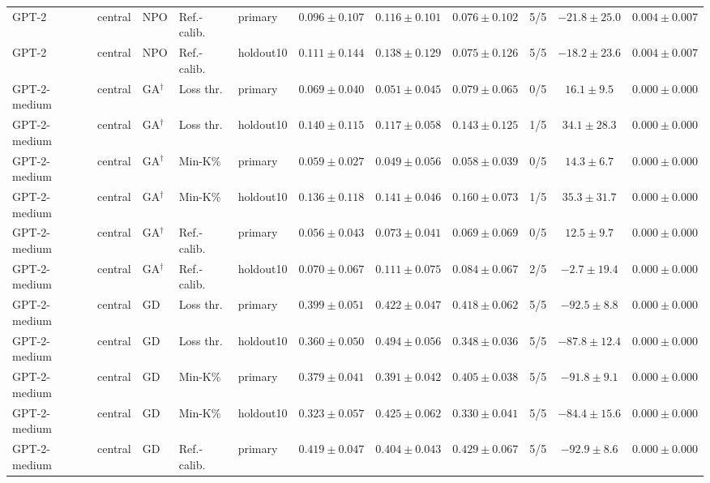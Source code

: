 {\begin{longtable}{@{\extracolsep{\fill}}lllllcccccc@{}}
GPT-2 & central & NPO & Ref.-calib. & primary & $0.096 \pm 0.107$ & $0.116 \pm 0.101$ & $0.076 \pm 0.102$ & 5/5 & $-21.8 \pm 25.0$ & $0.004 \pm 0.007$ \\
GPT-2 & central & NPO & Ref.-calib. & holdout10 & $0.111 \pm 0.144$ & $0.138 \pm 0.129$ & $0.075 \pm 0.126$ & 5/5 & $-18.2 \pm 23.6$ & $0.004 \pm 0.007$ \\
GPT-2-medium & central & GA$^{\dagger}$ & Loss thr. & primary & $0.069 \pm 0.040$ & $0.051 \pm 0.045$ & $0.079 \pm 0.065$ & 0/5 & $16.1 \pm 9.5$ & $0.000 \pm 0.000$ \\
GPT-2-medium & central & GA$^{\dagger}$ & Loss thr. & holdout10 & $0.140 \pm 0.115$ & $0.117 \pm 0.058$ & $0.143 \pm 0.125$ & 1/5 & $34.1 \pm 28.3$ & $0.000 \pm 0.000$ \\
GPT-2-medium & central & GA$^{\dagger}$ & Min-K\% & primary & $0.059 \pm 0.027$ & $0.049 \pm 0.056$ & $0.058 \pm 0.039$ & 0/5 & $14.3 \pm 6.7$ & $0.000 \pm 0.000$ \\
GPT-2-medium & central & GA$^{\dagger}$ & Min-K\% & holdout10 & $0.136 \pm 0.118$ & $0.141 \pm 0.046$ & $0.160 \pm 0.073$ & 1/5 & $35.3 \pm 31.7$ & $0.000 \pm 0.000$ \\
GPT-2-medium & central & GA$^{\dagger}$ & Ref.-calib. & primary & $0.056 \pm 0.043$ & $0.073 \pm 0.041$ & $0.069 \pm 0.069$ & 0/5 & $12.5 \pm 9.7$ & $0.000 \pm 0.000$ \\
GPT-2-medium & central & GA$^{\dagger}$ & Ref.-calib. & holdout10 & $0.070 \pm 0.067$ & $0.111 \pm 0.075$ & $0.084 \pm 0.067$ & 2/5 & $-2.7 \pm 19.4$ & $0.000 \pm 0.000$ \\
GPT-2-medium & central & GD & Loss thr. & primary & $0.399 \pm 0.051$ & $0.422 \pm 0.047$ & $0.418 \pm 0.062$ & 5/5 & $-92.5 \pm 8.8$ & $0.000 \pm 0.000$ \\
GPT-2-medium & central & GD & Loss thr. & holdout10 & $0.360 \pm 0.050$ & $0.494 \pm 0.056$ & $0.348 \pm 0.036$ & 5/5 & $-87.8 \pm 12.4$ & $0.000 \pm 0.000$ \\
GPT-2-medium & central & GD & Min-K\% & primary & $0.379 \pm 0.041$ & $0.391 \pm 0.042$ & $0.405 \pm 0.038$ & 5/5 & $-91.8 \pm 9.1$ & $0.000 \pm 0.000$ \\
GPT-2-medium & central & GD & Min-K\% & holdout10 & $0.323 \pm 0.057$ & $0.425 \pm 0.062$ & $0.330 \pm 0.041$ & 5/5 & $-84.4 \pm 15.6$ & $0.000 \pm 0.000$ \\
GPT-2-medium & central & GD & Ref.-calib. & primary & $0.419 \pm 0.047$ & $0.404 \pm 0.043$ & $0.429 \pm 0.067$ & 5/5 & $-92.9 \pm 8.6$ & $0.000 \pm 0.000$ \\

\end{longtable}}
